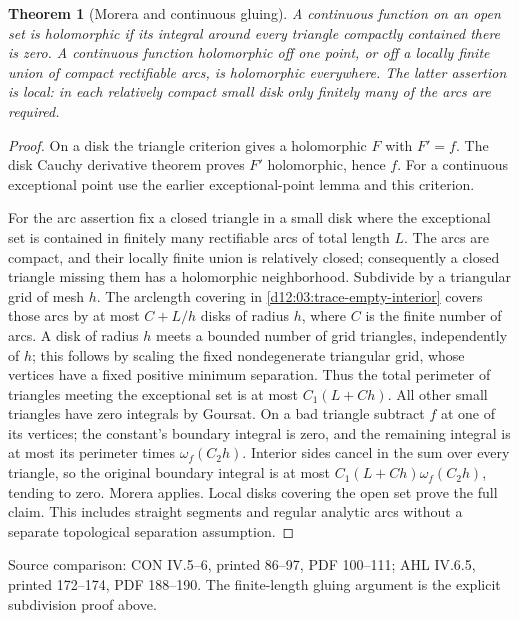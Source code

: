 \documentclass[11pt,a4paper,openany]{book}
\newtheorem{theorem}{Theorem}[chapter]
\theoremstyle{definition}
\theoremstyle{remark}\newtheorem{remark}[theorem]{Remark}
\newcommand{\family}[1]{}
\newcommand{\source}[1]{\par\begingroup\small\sffamily\color{black!65}Source comparison: #1\par\endgroup}
\begin{document}
\begin{theorem}[Morera and continuous gluing]\family{D12.04.08}\label{d12:04-08}
A continuous function on an open set is holomorphic if its integral
around every triangle compactly contained there is zero.
A continuous function holomorphic off one point, or off a locally
finite union of compact rectifiable arcs, is holomorphic everywhere.
The latter assertion is local: in each relatively compact small disk
only finitely many of the arcs are required.
\end{theorem}
\begin{proof}
On a disk the triangle criterion gives a holomorphic \(F\) with \(F'=f\).
The disk Cauchy derivative theorem proves \(F'\) holomorphic, hence \(f\).
For a continuous exceptional point use the earlier exceptional-point
lemma and this criterion.

For the arc assertion fix a closed triangle in a small disk where the
exceptional set is contained in finitely many rectifiable arcs of total
length \(L\). The arcs are compact, and their locally finite union is
relatively closed; consequently a closed triangle missing them has a
holomorphic neighborhood. Subdivide by a triangular grid of mesh \(h\).
The arclength covering in \cref{d12:03:trace-empty-interior} covers those
arcs by at most \(C+L/h\) disks of radius \(h\), where \(C\) is the
finite number of arcs. A disk of radius \(h\) meets a bounded number
of grid triangles, independently of \(h\); this follows by scaling the
fixed nondegenerate triangular grid, whose vertices have a fixed
positive minimum separation.
Thus the total perimeter of triangles meeting the exceptional set is
at most \(C_1(L+Ch)\). All other small triangles have zero integrals
by Goursat. On a bad triangle subtract \(f\) at one of its vertices;
the constant's boundary integral is zero, and the remaining integral
is at most its perimeter times \(\omega_f(C_2h)\).
Interior sides cancel in the sum over every triangle, so the original
boundary integral is at most
\(C_1(L+Ch)\omega_f(C_2h)\), tending to zero.
Morera applies. Local disks covering the open set prove the full claim.
This includes straight segments and regular analytic arcs without a
separate topological separation assumption.
\end{proof}
\source{CON IV.5--6, printed 86--97, PDF 100--111; AHL IV.6.5, printed 172--174, PDF 188--190. The finite-length gluing argument is the explicit subdivision proof above.}




\end{document}
